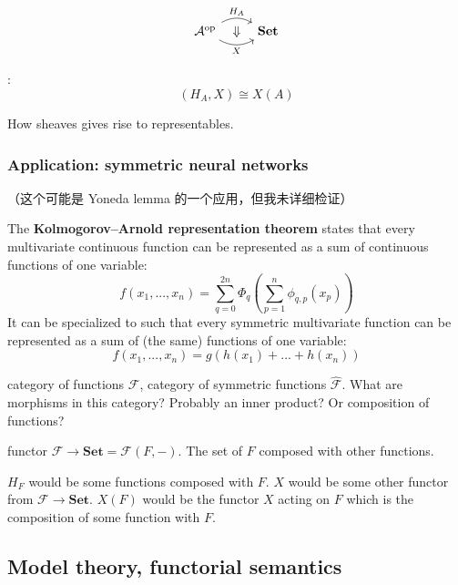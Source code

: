 \begin{equation}
\begin{tikzcd}
\mathcal{A}^{\mathrm{op}} 
\arrow[r, bend left=30, "H_A"]
\arrow[r, bend right=30, swap, "X"]
\arrow[r, phantom, "\Downarrow"]
& \mathbf{Set}
\end{tikzcd}
\end{equation}

:
\begin{equation}
[\mathcal{A}^{\mathrm{op}} , \mathbf{Set}] (H_A, X) \cong X(A)
\end{equation}

How sheaves gives rise to representables.

\subsubsection{Application: symmetric neural networks}

（这个可能是 Yoneda lemma 的一个应用，但我未详细检证）

The \textbf{Kolmogorov–Arnold representation theorem} states that every multivariate continuous function can be represented as a sum of continuous functions of one variable:
\begin{equation}
f(x_1,... ,x_n) = \sum_{q=0}^{2n}\Phi_{q} \left(\sum_{p=1}^n \phi_{q,p}(x_p) \right)
\end{equation}
It can be specialized to such that every symmetric multivariate function can be represented as a sum of (the same) functions of one variable:
\begin{equation}
\label{symmetric-functions}
f(x_1, ..., x_n) = g(h(x_1) + ... + h(x_n))
\end{equation}

category of functions $\mathcal{F}$, category of symmetric functions $\hat{\mathcal{F}}$.  What are morphisms in this category?  Probably an inner product?  Or composition of functions?

functor $\mathcal{F} \rightarrow \mathbf{Set} = \mathcal{F}(F, -)$.  The set of $F$ composed with other functions.  

$H_F$ would be some functions composed with $F$.  $X$ would be some other functor from $\mathcal{F} \rightarrow \mathbf{Set}$.  $X(F)$ would be the functor $X$ acting on $F$ which is the composition of some function with $F$. 

\subsection{Model theory, functorial semantics}

